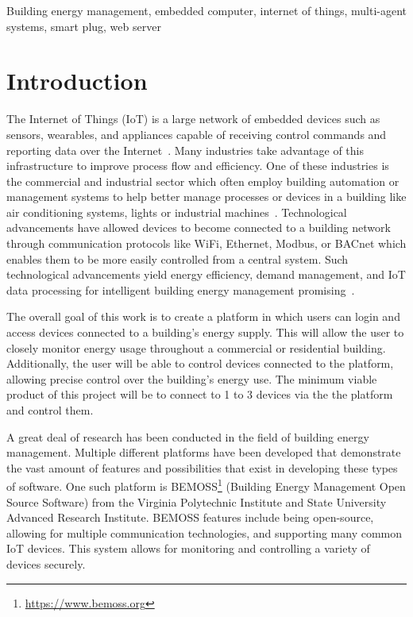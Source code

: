 \documentclass[conference]{IEEEtran}
\begin{document}
\begin{IEEEkeywords}
  Building energy management, embedded computer, internet of things, multi-agent systems, smart plug,  web server
\end{IEEEkeywords}

\section{Introduction}
\label{sec:introduction}

The Internet of Things (IoT) is a large network of embedded devices such as sensors, wearables, and appliances capable of receiving control commands and reporting
data over the Internet~\cite{Ozadowicz2015,Dagdougui2019}. Many industries take advantage of this infrastructure to
improve process flow and efficiency. One of these industries is the commercial
and industrial sector which often employ building automation or management
systems to help better manage processes or devices in a building like air
conditioning systems, lights or industrial machines~\cite{Yang2015}. Technological advancements
have allowed devices to become connected to a building network through
communication protocols like WiFi, Ethernet, Modbus, or BACnet which enables
them to be more easily controlled from a central system. Such technological
advancements yield energy efficiency, demand management, and IoT data processing for intelligent building energy management promising~\cite{Yang2015,Reddy2019,Lee2019}. 


The overall goal of this work is to create a platform in which users can login and access devices
connected to a building's energy supply. This will allow the user to closely
monitor energy usage throughout a commercial or residential building.
Additionally, the user will be able to control devices connected to the
platform, allowing precise control over the building's energy use. The minimum
viable product of this project will be to connect to 1 to 3 devices via the the
platform and control them.


A great deal of research has been conducted in the field of building energy
management. Multiple different platforms have been developed that demonstrate
the vast amount of features and possibilities that exist in developing these
types of software. One such platform is
BEMOSS\footnote{\href{https://www.bemoss.org}{https://www.bemoss.org}} (Building
Energy Management Open Source Software) from the Virginia Polytechnic Institute
and State University Advanced Research Institute. BEMOSS features include being
open-source, allowing for multiple communication technologies, and supporting
many common IoT devices. This system allows for monitoring and controlling a
variety of devices securely.
\end{document}
